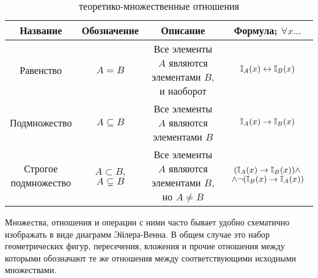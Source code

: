 \FloatBarrier

\begin{table}[ht!]
    \center
    \begin{tabular}{|c|c|c|c|}
        \hline
        Название & Обозначение & Описание & Формула; $ \forall x \ldots $ \\
        \hline
        \hline
        Равенство                              & $ A = B $                              & \makecell{Все элементы $ A $ являются \\ элементами $ B $, и наоборот} & $ \mathbb{I}_A(x) \leftrightarrow \mathbb{I}_B(x) $ \\
        Подмножество                           & $ A \subseteq B $                      & \makecell{Все элементы $ A $ являются \\ элементами $ B $}             & $ \mathbb{I}_A(x) \rightarrow \mathbb{I}_B(x) $ \\
        \makecell{Строгое \\ подмножество}     & $ A \subset B $, $ A \varsubsetneq B $ & \makecell{Все элементы $ A $ являются \\ элементами $ B $, но $ A \neq B $} & \makecell{$ (\mathbb{I}_{A}(x) \rightarrow \mathbb{I}_B(x)) \wedge $ \\ $ \wedge \neg (\mathbb{I}_B(x) \rightarrow \mathbb{I}_A(x)) $} \\
        \hline
    \end{tabular}
    \caption{теоретико-множественные отношения}
    \label{tab:sets:relations}
\end{table}

\FloatBarrier

Множества, отношения и операции с ними часто бывает удобно схематично изображать в виде диаграмм Эйлера-Венна.
В общем случае это набор геометрических фигур, пересечения, вложения и прочие отношения между которыми обозначают те же отношения между соответствующими исходными множествами.

